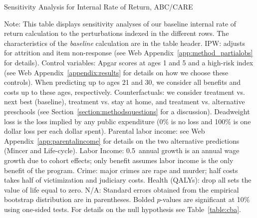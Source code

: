 \begin{table}
\begin{threeparttable}
\caption{Sensitivity Analysis for Internal Rate of Return, ABC/CARE}
\label{table:irrsens}
\centering
\scriptsize

\begin{tablenotes}
\scriptsize
\item Note: This table displays sensitivity analyses of our baseline internal rate of return calculation to the perturbations indexed in the different rows. The characteristics of the \textit{baseline} calculation are in the table header. IPW: adjusts for attrition and item non-response (see Web Appendix~\ref{app:method_partialobs} for details). Control variables: Apgar scores at ages 1 and 5 and a high-risk index (see Web Appendix~\ref{appendix:results} for details on how we choose these controls). When predicting up to ages 21 and 30, we consider all benefits and costs up to these ages, respectively. Counterfactuals: we consider treatment vs. next best (baseline), treatment vs. stay at home, and treatment vs. alternative preschools (see Section~\ref{section:methodsquestions} for a discussion). Deadweight loss is the loss implied by any public expenditure (0\% is no loss and 100\% is one dollar loss per each dollar spent). Parental labor income: see Web Appendix~\ref{app:parentalincome} for details on the two alternative predictions (Mincer and Life-cycle). Labor Income: 0.5\ annual growth is an annual wage growth due to cohort effects; only benefit assumes labor income is the only benefit of the program. Crime: major crimes are rape and murder; half costs takes half of victimization and judiciary costs. Health (QALYs): drop all sets the value of life equal to zero. N/A: Standard errors obtained from the empirical bootstrap distribution are in parentheses. Bolded $p$-values are significant at 10\% using one-sided tests. For details on the null hypothesis see Table~\ref{table:cba}.
\end{tablenotes}
\end{threeparttable}
\end{table}
\doublespacing

